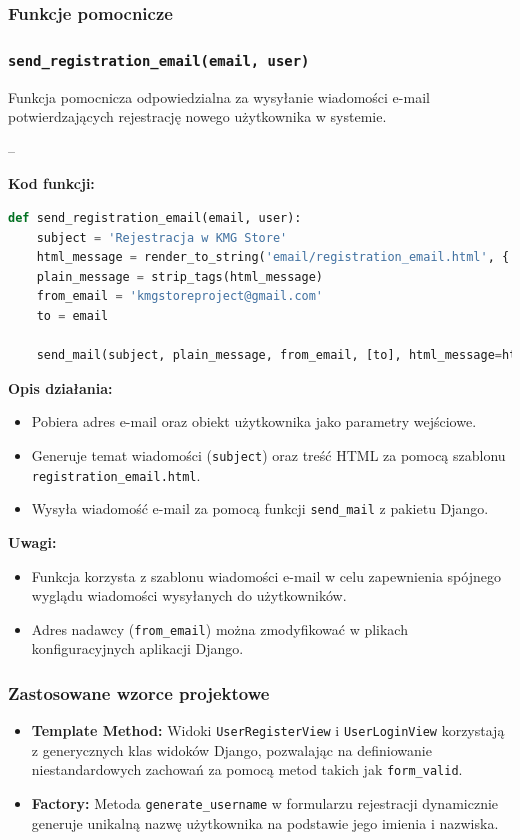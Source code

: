 \documentclass[12pt,a4paper,oneside]{article}
\theoremstyle{definition}
\numberwithin{equation}{section}
\begin{document}
\subsubsection{Funkcje pomocnicze}
\label{sec:helper_functions}

\subsubsection*{\texttt{send\_registration\_email(email, user)}}
Funkcja pomocnicza odpowiedzialna za wysyłanie wiadomości e-mail potwierdzających rejestrację nowego użytkownika w systemie.

--

\textbf{Kod funkcji:}
\begin{lstlisting}[language=Python, caption=Funkcja send_registration_email]
def send_registration_email(email, user):
    subject = 'Rejestracja w KMG Store'
    html_message = render_to_string('email/registration_email.html', {'user': user})
    plain_message = strip_tags(html_message)
    from_email = 'kmgstoreproject@gmail.com'
    to = email

    send_mail(subject, plain_message, from_email, [to], html_message=html_message)
\end{lstlisting}

\textbf{Opis działania:}
\begin{itemize}
    \item Pobiera adres e-mail oraz obiekt użytkownika jako parametry wejściowe.
    \item Generuje temat wiadomości (\texttt{subject}) oraz treść HTML za pomocą szablonu \texttt{registration\_email.html}.
    \item Wysyła wiadomość e-mail za pomocą funkcji \texttt{send\_mail} z pakietu Django.
\end{itemize}

\textbf{Uwagi:}
\begin{itemize}
    \item Funkcja korzysta z szablonu wiadomości e-mail w celu zapewnienia spójnego wyglądu wiadomości wysyłanych do użytkowników.
    \item Adres nadawcy (\texttt{from\_email}) można zmodyfikować w plikach konfiguracyjnych aplikacji Django.
\end{itemize}

\subsubsection*{Zastosowane wzorce projektowe}
\begin{itemize}
    \item \textbf{Template Method:} Widoki \texttt{UserRegisterView} i \texttt{UserLoginView} korzystają z generycznych klas widoków Django, pozwalając na definiowanie niestandardowych zachowań za pomocą metod takich jak \texttt{form\_valid}.
    \item \textbf{Factory:} Metoda \texttt{generate\_username} w formularzu rejestracji dynamicznie generuje unikalną nazwę użytkownika na podstawie jego imienia i nazwiska.
\end{itemize}
\end{document}
